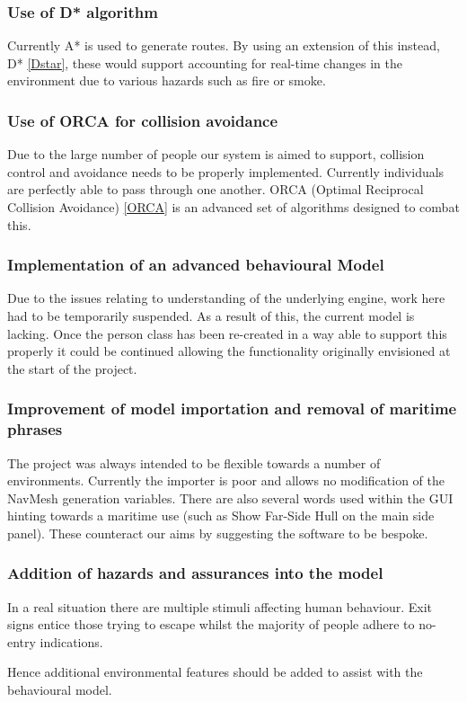 \subsubsection{Use of D{*} algorithm}

Currently A{*} is used to generate routes. By using an extension of this instead, D{*} \ref{Dstar}, these would support accounting for real-time changes in the environment due to various hazards such as fire or smoke.


\subsubsection{Use of ORCA for collision avoidance}
\label{Problems:subsubsec:ORCA}

Due to the large number of people our system is aimed to support, collision
control and avoidance needs to be properly implemented. Currently
individuals are perfectly able to pass through one another. ORCA (Optimal
Reciprocal Collision Avoidance) \ref{ORCA} is an advanced set of algorithms designed
to combat this.


\subsubsection{Implementation of an advanced behavioural Model}

Due to the issues relating to understanding of the underlying engine,
work here had to be temporarily suspended. As a result of this, the
current model is lacking. Once the person class has been
re-created in a way able to support this properly it could be continued
allowing the functionality originally envisioned at the start of the
project.


\subsubsection{Improvement of model importation and removal of maritime phrases}

The project was always intended to be flexible towards a number of
environments. Currently the importer is poor and allows no modification
of the NavMesh generation variables. There are also several words
used within the GUI hinting towards a maritime use (such as Show Far-Side
Hull on the main side panel). These counteract our aims by suggesting
the software to be bespoke.


\subsubsection{Addition of hazards and assurances into the model}

In a real situation there are multiple stimuli affecting human behaviour.
Exit signs entice those trying to escape whilst the majority of people
adhere to no-entry indications.

Hence additional environmental features should be added to assist
with the behavioural model.



